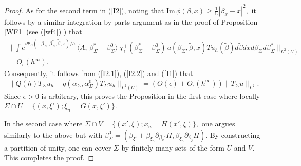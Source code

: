 \documentclass[10pt,a4paper]{amsart}
\renewcommand{\Im} {\mathrm{Im\,}}
\begin{document}
\begin{proof}
 As for the second term in (\ref{I2}), noting that $\Im \phi(\beta,x) \geq \frac{1}{C} |\beta_x - x|^2,$ it follows by a similar integration by parts argument as in the proof of Proposition \ref{WF1} (see (\ref{wf4}) ) that 
 \begin{eqnarray} \label{I2.2}
\Big\| \int e^{i \Psi_{\Sigma}(\cdot, \beta_{\Sigma}, \beta_{\Sigma}^*, \tilde{\beta},x)/h} \, \langle A,   \,  \beta^{*}_{\Sigma} - \beta_{\Sigma}^{0}  \rangle  \, \chi_{\epsilon}^+ ( \beta^{*}_{\Sigma} - \beta_{\Sigma}^{0}  ) \, a (\beta_{\Sigma}, \tilde{\beta},x) Tu_h(\tilde{\beta}) d\tilde{\beta}  dx d\beta_{\Sigma} d \beta_{\Sigma}^* \Big\|_{L^2(U)}  \nonumber \\
 = O_{\epsilon}(h^{\infty}). \hspace{1in}
 \end{eqnarray}
 Consequently, it follows from (\ref{I2.1}), (\ref{I2.2}) and (\ref{I1}) that
 \begin{equation} \label{upshot}
\|  Q(h) T_{\Sigma} u_h  - q(\alpha_{\Sigma}, \alpha_{\Sigma}^0) T_{\Sigma} u_h \|_{L^2(U)} = ( O(\epsilon) + O_{\epsilon}(h^{\infty}) ) \| T_{\Sigma} u \|_{L^2}.
\end{equation}
Since $\epsilon >0$ is arbitrary, this proves the Proposition in the first case where locally $ \Sigma \cap U = \{ (x, \xi'); \xi_n = G(x,\xi') \}.$

In the second case where $ \Sigma \cap V = \{ (x',\xi); x_n = H(x',\xi)  \},$ one argues similarly to the above but with $\beta_{\Sigma}^0 = ( \beta_{\xi'} + \beta_{\xi_n} \partial_{\beta_x'}H, \beta_{\xi_n} \partial_{\beta_{\xi}}H ).$
By constructing  a partition of unity, one can cover $\Sigma$ by finitely many sets of the form $U$ and $V$. This completes the proof.

\end{proof}
\end{document}
